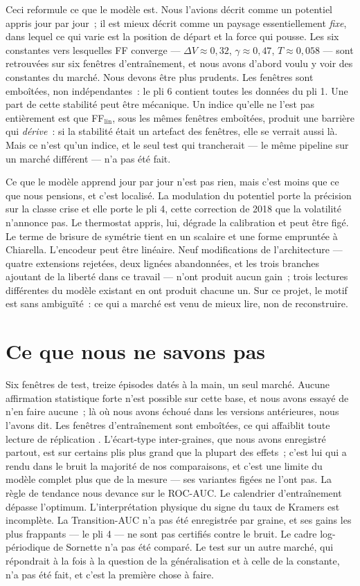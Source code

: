 \documentclass[11pt,a4paper]{article}
\newcommand{\dV}{\Delta V}
\begin{document}
Ceci reformule ce que le modèle est. Nous l'avions décrit comme un potentiel appris jour par jour~; il est mieux décrit comme un paysage essentiellement \emph{fixe}, dans lequel ce qui varie est la position de départ et la force qui pousse. Les six constantes vers lesquelles FF converge --- $\dV\approx0{,}32$, $\gamma\approx0{,}47$, $T\approx0{,}058$ --- sont retrouvées sur six fenêtres d'entraînement, et nous avons d'abord voulu y voir des constantes du marché. Nous devons être plus prudents. Les fenêtres sont emboîtées, non indépendantes~: le pli 6 contient toutes les données du pli 1. Une part de cette stabilité peut être mécanique. Un indice qu'elle ne l'est pas entièrement est que FF$_\mathrm{lin}$, sous les mêmes fenêtres emboîtées, produit une barrière qui \emph{dérive}~: si la stabilité était un artefact des fenêtres, elle se verrait aussi là. Mais ce n'est qu'un indice, et le seul test qui trancherait --- le même pipeline sur un marché différent --- n'a pas été fait.

Ce que le modèle apprend jour par jour n'est pas rien, mais c'est moins que ce que nous pensions, et c'est localisé. La modulation du potentiel porte la précision sur la classe crise et elle porte le pli 4, cette correction de 2018 que la volatilité n'annonce pas. Le thermostat appris, lui, dégrade la calibration et peut être figé. Le terme de brisure de symétrie tient en un scalaire et une forme empruntée à Chiarella. L'encodeur peut être linéaire. Neuf modifications de l'architecture --- quatre extensions rejetées, deux lignées abandonnées, et les trois branches ajoutant de la liberté dans ce travail --- n'ont produit aucun gain~; trois lectures différentes du modèle existant en ont produit chacune un. Sur ce projet, le motif est sans ambiguïté~: ce qui a marché est venu de mieux lire, non de reconstruire.

\section{Ce que nous ne savons pas}
\label{sec:limits}

Six fenêtres de test, treize épisodes datés à la main, un seul marché. Aucune affirmation statistique forte n'est possible sur cette base, et nous avons essayé de n'en faire aucune~; là où nous avons échoué dans les versions antérieures, nous l'avons dit. Les fenêtres d'entraînement sont emboîtées, ce qui affaiblit toute lecture de \og réplication \fg{}. L'écart-type inter-graines, que nous avons enregistré partout, est sur certains plis plus grand que la plupart des effets~; c'est lui qui a rendu \og dans le bruit \fg{} la majorité de nos comparaisons, et c'est une limite du modèle complet plus que de la mesure --- ses variantes figées ne l'ont pas. La règle de tendance nous devance sur le ROC-AUC. Le calendrier d'entraînement dépasse l'optimum. L'interprétation physique du signe du taux de Kramers est incomplète. La Transition-AUC n'a pas été enregistrée par graine, et ses gains les plus frappants --- le pli 4 --- ne sont pas certifiés contre le bruit. Le cadre log-périodique de Sornette n'a pas été comparé. Le test sur un autre marché, qui répondrait à la fois à la question de la généralisation et à celle de la constante, n'a pas été fait, et c'est la première chose à faire.
\end{document}
